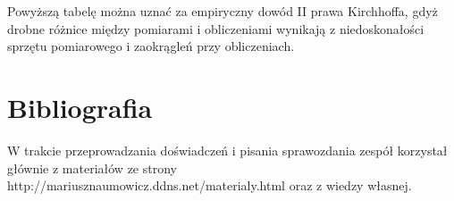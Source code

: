 \documentclass[polish,a4paper]{article}
\begin{document}
\begin{flushleft}
Powyższą tabelę można uznać za empiryczny dowód II prawa Kirchhoffa, gdyż drobne różnice między pomiarami i obliczeniami wynikają z niedoskonałości sprzętu pomiarowego i zaokrągleń przy obliczeniach.
\end{flushleft}




\section{Bibliografia}
W trakcie przeprowadzania doświadczeń i pisania sprawozdania zespół korzystał głównie z materiałów ze strony http://mariusznaumowicz.ddns.net/materialy.html oraz z wiedzy własnej.



\end{document}
